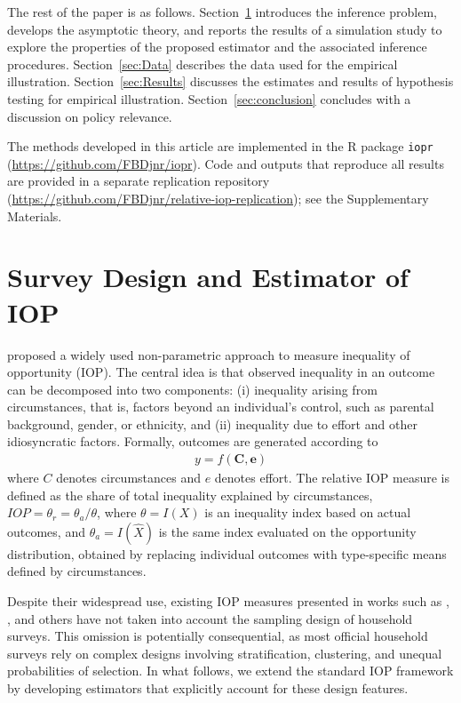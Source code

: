 \documentclass[12pt]{article}
\theoremstyle{plain}
\theoremstyle{definition}
\begin{document}
The rest of the paper is as follows. Section~\ref{sec:survey_design} introduces the inference problem, develops the asymptotic theory, and reports the results of a simulation study to explore the properties of the proposed estimator and the associated inference procedures. Section~\ref{sec:Data} describes the data used for the empirical illustration. Section~\ref{sec:Results} discusses the estimates and results of hypothesis testing for empirical illustration. Section~\ref{sec:conclusion} concludes with a discussion on policy relevance.

The methods developed in this article are implemented in the \textsf{R} package \texttt{iopr} (\url{https://github.com/FBDjnr/iopr}). Code and outputs that reproduce all results are provided in a separate replication repository (\url{https://github.com/FBDjnr/relative-iop-replication}); see the Supplementary Materials.

\section{Survey Design and Estimator of IOP}
\label{sec:survey_design}

\cite{ferreira2011measurement} proposed a widely used non-parametric approach to measure inequality of opportunity (IOP). The central idea is that observed inequality in an outcome can be decomposed into two components: (i) inequality arising from circumstances, that is, factors beyond an individual’s control, such as parental background, gender, or ethnicity, and (ii) inequality due to effort and other idiosyncratic factors. Formally, outcomes are generated according to
\begin{align}
y=f(\bm{C},\bm{e})    
\end{align}
where $C$ denotes circumstances and $e$ denotes effort. The relative IOP measure is defined as the share of total inequality explained by circumstances,
$IOP=\theta_r=\theta_a/\theta$, where $\theta=I(X)$ is an inequality index based on actual outcomes, and $\theta_a=I(\hat{X})$ is the same index evaluated on the opportunity distribution, obtained by replacing individual outcomes with type-specific means defined by circumstances. 

Despite their widespread use, existing IOP measures presented in works such as \cite{lefranc2020inequality}, \cite{ferreira2011measurement}, and others have not taken into account the sampling design of household surveys. This omission is potentially consequential, as most official household surveys rely on complex designs involving stratification, clustering, and unequal probabilities of selection. In what follows, we extend the standard IOP framework by developing estimators that explicitly account for these design features.
\end{document}
